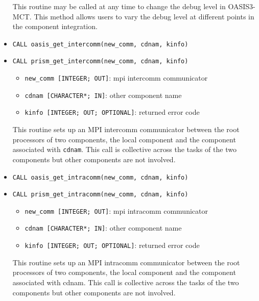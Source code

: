 \begin{itemize}
  This routine may be called at any time to change the debug level in
  OASIS3-MCT.  This method allows users to vary the debug level at
  different points in the component integration.

  \vspace{0.2cm}
\item {\tt CALL oasis\_get\_intercomm(new\_comm, cdnam, kinfo)}
\item {\tt CALL prism\_get\_intercomm(new\_comm, cdnam, kinfo)}
  \begin{itemize}
  \item {\tt new\_comm [INTEGER; OUT]}: mpi intercomm communicator
  \item {\tt cdnam [CHARACTER*; IN]}: other component name
  \item {\tt kinfo [INTEGER; OUT; OPTIONAL]}: returned error code
  \end{itemize}

  This routine sets up an MPI intercomm communicator between the root
  processors of two components, the local component and the component
  associated with {\tt cdnam}.  This call is collective across the
  tasks of the two components but other components are not involved.

  \vspace{0.2cm}
\item {\tt CALL oasis\_get\_intracomm(new\_comm, cdnam, kinfo)}
\item {\tt CALL prism\_get\_intracomm(new\_comm, cdnam, kinfo)}
  \begin{itemize}
  \item {\tt new\_comm [INTEGER; OUT]}: mpi intracomm communicator
  \item {\tt cdnam [CHARACTER*; IN]}: other component name
  \item {\tt kinfo [INTEGER; OUT; OPTIONAL]}: returned error code
  \end{itemize}

  This routine sets up an MPI intracomm communicator between the root
  processors of two components, the local component and the component
  associated with cdnam.  This call is collective across the tasks of
  the two components but other components are not involved.


\end{itemize}
